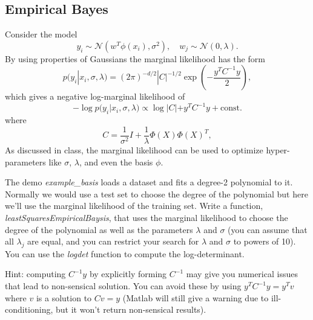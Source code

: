 \documentclass{article}
\begin{document}
\subsection{Empirical Bayes}

 Consider the model
\[
y_i \sim \mathcal{N}(w^T\phi(x_i),\sigma^2), \quad w_j \sim \mathcal{N}(0,\lambda).
\]
By using properties of Gaussians the marginal likelihood has the form
\[
p(y_i|x_i,\sigma,\lambda) = (2\pi)^{-d/2}|C|^{-1/2}\exp\left(-\frac{y^TC^{-1}y}{2}\right),
\]
which gives a negative log-marginal likelihood of
\[
- \log p(y_i|x_i,\sigma,\lambda) \propto \log|C| + y^TC^{-1}y + \text{const.}
\]
where
\[
C = \frac{1}{\sigma^2}I + \frac{1}{\lambda}\Phi(X)\Phi(X)^T,
\]
As discussed in class, the marginal likelihood can be used to optimize hyper-parameters like $\sigma$, $\lambda$, and even the basis $\phi$.

The demo \emph{example\_basis} loads a dataset and fits a degree-2 polynomial to it. Normally we would use a test set to choose the degree of the polynomial but here we'll use the marginal likelihood of the training set. Write a function, \emph{leastSquaresEmpiricalBaysis}, that uses the marginal likelihood to choose the degree of the polynomial as well as the parameters $\lambda$ and $\sigma$ (you can assume that all $\lambda_j$ are equal, and you can restrict your search for $\lambda$ and $\sigma$ to powers of 10).  You can use the \emph{logdet} function to compute the log-determinant.

{Hint: computing $C^{-1}y$ by explicitly forming $C^{-1}$ may give you numerical issues that lead to non-sensical solution. You can avoid these by using $y^TC^{-1}y = y^Tv$ where $v$ is a solution to $Cv = y$ (Matlab will still give a warning due to ill-conditioning, but it won't return non-sensical results).}
\end{document}
